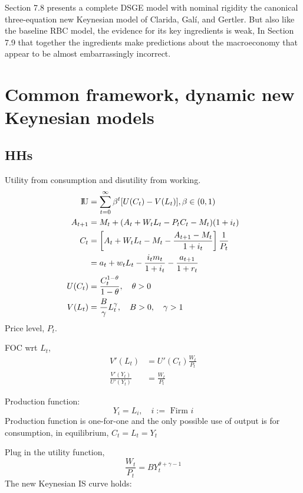 \documentclass[12pt]{article}
\begin{document}
Section 7.8 presents
a complete DSGE model with nominal rigidity the canonical three-equation
new Keynesian model of Clarida, Galí, and Gertler.
But also like the baseline RBC model, the evidence for its key ingredients is weak,
In Section 7.9 that together the
ingredients make predictions about the macroeconomy that appear to be
almost embarrassingly incorrect.




\section{Common framework, dynamic new Keynesian models}
\subsection{HHs}
Utility from consumption and disutility from working.
\begin{align*}
		{\rm I\!{U}} &= \sum\limits_{t =0} ^\infty \beta^{t}[U(C_{t}) - V(L_{t})]	, \beta \in (0,1)\\
A_{t + 1}&= M_{t} + (A_{t} + W_{t}L_{t} - P_{t}C_{t} - M_{t})(1 + i_{t})\\
C_{t}&= \left[ A_{t} + W_{t}L_{t} - M_{t} - \frac{A_{t + 1} - M_{t}}{1 + i_{t}} \right] 
\frac{1}{P_{t}}\\
&= a_{t} + w_{t}L_{t} - \frac{i_{t}m_{t}}{1 + i_{t}} - \frac{a_{t + 1}}{1 + r_{t}}\\
U(C_{t})&= \frac{C_{t}^{1 - \theta}}{1 - \theta}, \quad \theta > 0\\
V(L_{t})&= \frac{B}{\gamma} L_{t}^{\gamma}, \quad B > 0, \quad \gamma > 1
\end{align*}
Price level, $ P_{t} $.

FOC wrt $ L_{t} $,
\begin{align*}
V'(L_{t}) &= U'(C_{t})\frac{W_{t}}{P_{t}}\\
\frac{V'(Y_{t})}{U'(Y_{t})}&= \frac{W_{t}}{P_{t}}
\end{align*}

Production function:
\begin{equation*}
Y_{i} = L_{i}, \quad i:= \text{ Firm }i
\end{equation*}
Production function is one-for-one and the only possible use of output is for 
consumption, in equilibrium, $ C_{t} = L_{t} = Y_{t} $

Plug in the utility function,
\begin{equation*}
\frac{W_{t}}{P_{t}} = BY_{t}^{\theta + \gamma - 1}
\end{equation*}
The new Keynesian IS curve holds:
\end{document}
